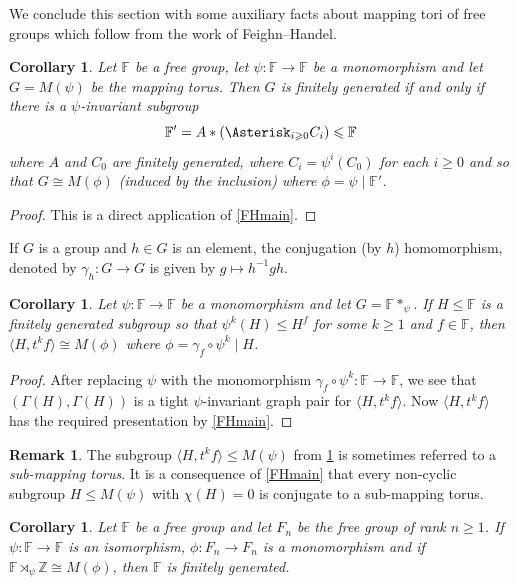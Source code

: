 \documentclass[11pt, a4paper]{amsart}
\newtheorem{corollary}[theorem]{Corollary}
\theoremstyle{definition}
\newtheorem{remark}[theorem]{Remark}
\newcommand{\isom}{\cong}
\newcommand{\F}{\mathbb{F}}
\newcommand{\Z}{\mathbb{Z}}
\begin{document}
We conclude this section with some auxiliary facts about mapping tori of free groups which follow from the work of Feighn--Handel.



\begin{corollary}
\label{cor:free_prod_decomp1}
Let $\F$ be a free group, let $\psi\colon \F\to \F$ be a monomorphism and let $G=M(\psi)$ be the mapping torus. Then $G$ is finitely generated if and only if there is a $\psi$-invariant subgroup
\[
\F' = A*\left(\Asterisk_{i\geqslant 0}C_i\right)\leqslant \F
\]
where $A$ and $C_0$ are finitely generated, where $C_i = \psi^i(C_0)$ for each $i\geqslant 0$ and so that $G\cong M(\phi)$ (induced by the inclusion) where $\phi = \psi\mid\F'$. 
\end{corollary}

\begin{proof}
This is a direct application of \cref{FHmain}.
\end{proof}


If $G$ is a group and $h\in G$ is an element, the conjugation (by $h$) homomorphism, denoted by $\gamma_h\colon G\to G$ is given by $g\mapsto h^{-1}gh$.


\begin{corollary}
\label{cor:Euler}
Let $\psi\colon \F\to \F$ be a monomorphism and let $G = \F*_{\psi}$. If $H\leqslant \F$ is a finitely generated subgroup so that $\psi^k(H)\leqslant H^f$ for some $k\geqslant 1$ and $f\in \F$, then $\langle H, t^kf\rangle \cong M(\phi)$ where $\phi = \gamma_f\circ\psi^k\mid H$.
\end{corollary}

\begin{proof}
After replacing $\psi$ with the monomorphism $\gamma_f\circ\psi^k\colon \F\to \F$, we see that $(\Gamma(H), \Gamma(H))$ is a tight $\psi$-invariant graph pair for $\langle H, t^kf\rangle$. Now $\langle H, t^kf\rangle$ has the required presentation by \cref{FHmain}.
\end{proof}

\begin{remark}
The subgroup $\langle H, t^kf\rangle\leqslant M(\psi)$ from \cref{cor:Euler} is sometimes referred to a \emph{sub-mapping torus}. It is a consequence of \cref{FHmain} that every non-cyclic subgroup $H\leqslant M(\psi)$ with $\chi(H) = 0$ is conjugate to a sub-mapping torus.
\end{remark}

\begin{corollary}
\label{fg_kernel} 
Let $\F$ be a free group and let $F_n$ be the free group of rank $n\geqslant 1$. If $\psi\colon \F\to \F$ is an isomorphism, $\phi\colon F_n\to F_n$ is a monomorphism and if $\F\rtimes_{\psi}\Z\isom M(\phi)$, then $\F$ is finitely generated.
\end{corollary}
\end{document}
